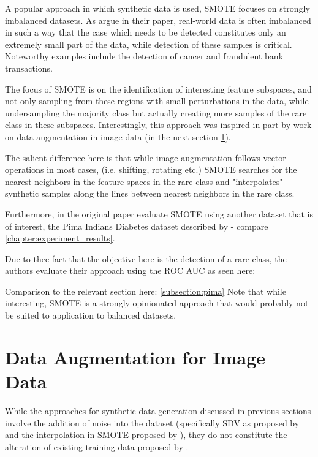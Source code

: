 A popular approach in which synthetic data is used, \ac{SMOTE} focuses on strongly imbalanced datasets. As \cite{smote} argue in their paper, real-world data is often imbalanced in such a way that the case which needs to be detected constitutes only an extremely small part of the data, while detection of these samples is critical. Noteworthy examples include the detection of cancer and fraudulent bank transactions.

The focus of \ac{SMOTE} is on the identification of interesting feature subspaces, and not only sampling from these regions with small perturbations in the data, while undersampling the majority class but actually creating more samples of the rare class in these subspaces. 
Interestingly, this approach was inspired in part by work on data augmentation in image data (in the next section \ref{section:image_augmentation}).

The salient difference here is that while image augmentation follows vector operations in most cases, (i.e. shifting, rotating etc.) \ac{SMOTE} searches for the nearest neighbors in the feature spaces in the rare class and "interpolates" synthetic samples along the lines between nearest neighbors in the rare class.

Furthermore, in the original paper \cite{smote} evaluate \ac{SMOTE} using another dataset that is of interest, the Pima Indians Diabetes dataset described by \cite{diabetes} - compare \ref{chapter:experiment_results}.

\pagebreak

Due to thee fact that the objective here is the detection of a rare class, the authors evaluate their approach using the \ac{ROC} \ac{AUC} as seen here:


Comparison to the relevant section here: \ref{subsection:pima}
Note that while interesting, \ac{SMOTE} is a strongly opinionated approach that would probably not be suited to application to balanced datasets.

\clearpage

\section{Data Augmentation for Image Data}
\label{section:image_augmentation}

While the approaches for synthetic data generation discussed in previous sections involve the addition of noise into the dataset (specifically \ac{SDV} as proposed by \cite{patki2016synthetic} and the interpolation in \ac{SMOTE} proposed by \cite{smote}), they do not constitute the alteration of existing training data proposed by \cite{image_augmentation}.

